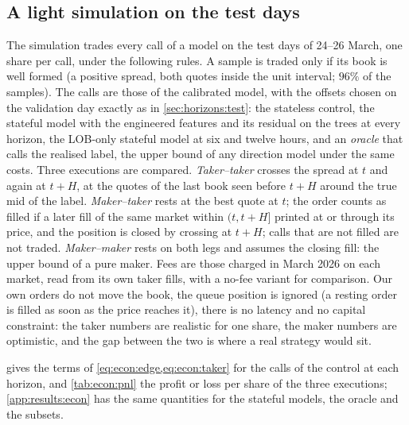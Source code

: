 \subsection{A light simulation on the test days}
\label{sec:econ:simulation}

The simulation trades every call of a model on the test days of 24--26 March, one share per
call, under the following rules.  A sample is traded only if its book is well formed (a
positive spread, both quotes inside the unit interval; $96\%$ of the samples).  The calls
are those of the calibrated model, with the offsets chosen on the validation day exactly as
in \cref{sec:horizons:test}: the stateless control, the stateful model with the engineered
features and its residual on the trees at every horizon, the LOB-only stateful model at six
and twelve hours, and an \emph{oracle} that calls the realised label, the upper bound of any direction model
under the same costs.  Three executions are compared.  \emph{Taker--taker} crosses the
spread at $t$ and again at $t + H$, at the quotes of the last book seen before $t + H$
around the true mid of the label.  \emph{Maker--taker} rests at the best quote at $t$; the
order counts as filled if a later fill of the same market within $(t, t + H]$ printed at or
through its price, and the position is closed by crossing at $t + H$; calls that are not
filled are not traded.  \emph{Maker--maker} rests on both legs and assumes the closing fill:
the upper bound of a pure maker.  Fees are those charged in March 2026 on each market, read
from its own taker fills, with a no-fee variant for comparison.  Our own orders do not move
the book, the queue position is ignored (a resting order is filled as soon as the price
reaches it), there is no latency and no capital constraint: the taker numbers are realistic
for one share, the maker numbers are optimistic, and the gap between the two is where a real
strategy would sit.

 gives the terms of \cref{eq:econ:edge,eq:econ:taker} for the calls of
the control at each horizon, and \cref{tab:econ:pnl} the profit or loss per share of the
three executions; \cref{app:results:econ} has the same quantities for the stateful models,
the oracle and the subsets.

